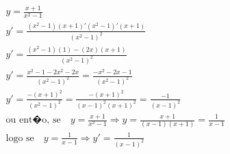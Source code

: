 \begin{ex}
\begin{align}
&y=\frac{x+1}{x^2-1}\nonumber\\
&y'=\frac{(x^2-1)(x+1)'(x^2-1)'(x+1)}{(x^2-1)^2}\nonumber\\
&y'=\frac{(x^2-1)(1)-(2x)(x+1)}{(x^2-1)^2}\nonumber\\
&y'=\frac{x^2-1-2x^2-2x}{(x^2-1)^2}=\frac{-x^2-2x-1}{(x^2-1)^2}\nonumber\\
&y'=\frac{-(x+1)^2}{(x^2-1)^2}=\frac{-(x+1)^2}{(x-1)^2(x+1)^2}=\frac{-1}{(x-1)^2}\nonumber\\
&\text{ou ent�o, se}\quad y=\frac{x+1}{x^2-1}\Rightarrow y=\frac{x+1}{(x-1)(x+1)}=\frac{1}{x-1}\nonumber\\
&\text{logo se}\quad y=\frac{1}{x-1} \Rightarrow y'=\frac{1}{(x-1)^2}\nonumber
\end{align}
\end{ex}
